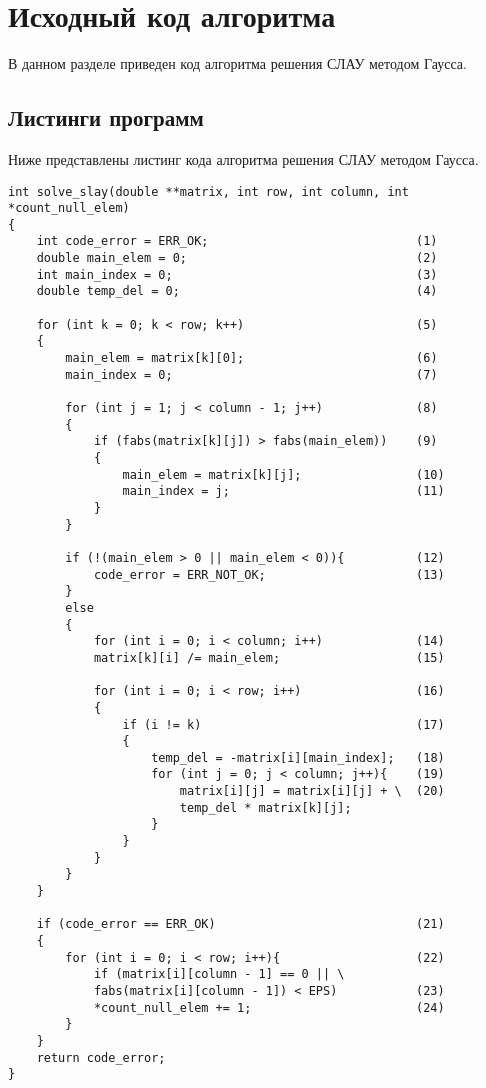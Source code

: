 \chapter{Исходный код алгоритма}
В данном разделе приведен код алгоритма решения СЛАУ методом Гаусса.

\section{Листинги программ}
Ниже представлены листинг кода алгоритма решения СЛАУ методом Гаусса.

\begin{lstlisting}[label = ordinary_min, caption=Программный код алгоритма нахождения минимума в матрице (последовательная реализация).]
int solve_slay(double **matrix, int row, int column, int *count_null_elem)
{
	int code_error = ERR_OK;                             (1)
	double main_elem = 0;                                (2)
	int main_index = 0;                                  (3)
	double temp_del = 0;                                 (4)
	
	for (int k = 0; k < row; k++)                        (5)
	{
		main_elem = matrix[k][0];                        (6)
		main_index = 0;                                  (7)
		
		for (int j = 1; j < column - 1; j++)             (8)
		{
			if (fabs(matrix[k][j]) > fabs(main_elem))    (9)
			{
				main_elem = matrix[k][j];                (10)
				main_index = j;                          (11)
			}
		}
		
		if (!(main_elem > 0 || main_elem < 0)){          (12)
			code_error = ERR_NOT_OK;                     (13)
		}
		else
		{
			for (int i = 0; i < column; i++)             (14)
			matrix[k][i] /= main_elem;                   (15)
			
			for (int i = 0; i < row; i++)                (16)
			{
				if (i != k)                              (17)
				{
					temp_del = -matrix[i][main_index];   (18)
					for (int j = 0; j < column; j++){    (19)
						matrix[i][j] = matrix[i][j] + \  (20)
						temp_del * matrix[k][j];  
					}
				} 
			}
		}
	}
	
	if (code_error == ERR_OK)                            (21)
	{
		for (int i = 0; i < row; i++){                   (22)
			if (matrix[i][column - 1] == 0 || \
			fabs(matrix[i][column - 1]) < EPS)           (23)
			*count_null_elem += 1;                       (24)
		}
	}
	return code_error;
}
\end{lstlisting}